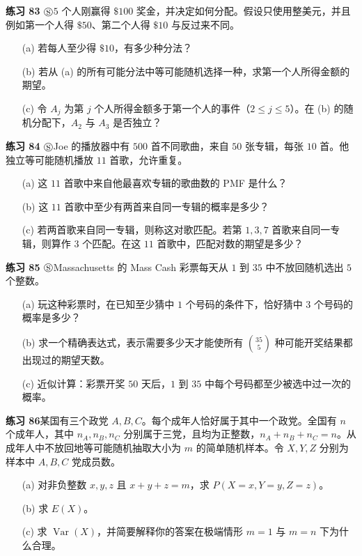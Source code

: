 \documentclass[UTF8,12pt,a4paper,fontset=fandol]{ctexart}
\begin{document}
\noindent\textbf{练习 83 $\circledS$}\quad $5$ 个人刚赢得 $\$100$ 奖金，并决定如何分配。假设只使用整美元，并且例如第一个人得 $\$50$、第二个人得 $\$10$ 与反过来不同。
\begin{enumerate}
  \item[(a)] 若每人至少得 $\$10$，有多少种分法？
  \item[(b)] 若从 (a) 的所有可能分法中等可能随机选择一种，求第一个人所得金额的期望。
  \item[(c)] 令 $A_j$ 为第 $j$ 个人所得金额多于第一个人的事件（$2\le j\le5$）。在 (b) 的随机分配下，$A_2$ 与 $A_3$ 是否独立？
\end{enumerate}

\noindent\textbf{练习 84 $\circledS$}\quad Joe 的播放器中有 $500$ 首不同歌曲，来自 $50$ 张专辑，每张 $10$ 首。他独立等可能随机播放 $11$ 首歌，允许重复。
\begin{enumerate}
  \item[(a)] 这 $11$ 首歌中来自他最喜欢专辑的歌曲数的 PMF 是什么？
  \item[(b)] 这 $11$ 首歌中至少有两首来自同一专辑的概率是多少？
  \item[(c)] 若两首歌来自同一专辑，则称这对歌匹配。若第 $1,3,7$ 首歌来自同一专辑，则算作 $3$ 个匹配。在这 $11$ 首歌中，匹配对数的期望是多少？
\end{enumerate}

\noindent\textbf{练习 85 $\circledS$}\quad Massachusetts 的 Mass Cash 彩票每天从 $1$ 到 $35$ 中不放回随机选出 $5$ 个整数。
\begin{enumerate}
  \item[(a)] 玩这种彩票时，在已知至少猜中 $1$ 个号码的条件下，恰好猜中 $3$ 个号码的概率是多少？
  \item[(b)] 求一个精确表达式，表示需要多少天才能使所有 $\binom{35}{5}$ 种可能开奖结果都出现过的期望天数。
  \item[(c)] 近似计算：彩票开奖 $50$ 天后，$1$ 到 $35$ 中每个号码都至少被选中过一次的概率。
\end{enumerate}

\noindent\textbf{练习 86}\quad 某国有三个政党 $A,B,C$。每个成年人恰好属于其中一个政党。全国有 $n$ 个成年人，其中 $n_A,n_B,n_C$ 分别属于三党，且均为正整数，$n_A+n_B+n_C=n$。从成年人中不放回地等可能随机抽取大小为 $m$ 的简单随机样本。令 $X,Y,Z$ 分别为样本中 $A,B,C$ 党成员数。
\begin{enumerate}
  \item[(a)] 对非负整数 $x,y,z$ 且 $x+y+z=m$，求 $P(X=x,Y=y,Z=z)$。
  \item[(b)] 求 $E(X)$。
  \item[(c)] 求 $\operatorname{Var}(X)$，并简要解释你的答案在极端情形 $m=1$ 与 $m=n$ 下为什么合理。
\end{enumerate}
\end{document}

